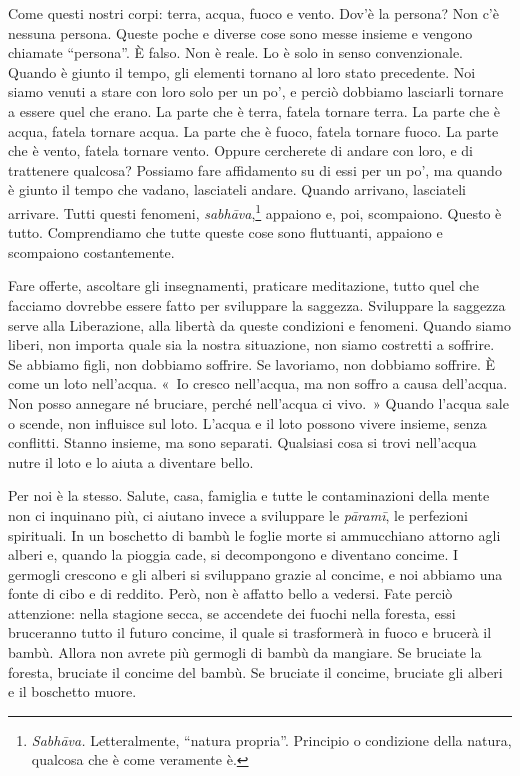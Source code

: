 Come questi nostri corpi: terra, acqua, fuoco e vento. Dov'è la persona?
Non c'è nessuna persona. Queste poche e diverse cose sono messe insieme
e vengono chiamate ``persona''. È falso. Non è reale. Lo è solo in senso
convenzionale. Quando è giunto il tempo, gli elementi tornano al loro
stato precedente. Noi siamo venuti a stare con loro solo per un po', e
perciò dobbiamo lasciarli tornare a essere quel che erano. La parte che
è terra, fatela tornare terra. La parte che è acqua, fatela tornare
acqua. La parte che è fuoco, fatela tornare fuoco. La parte che è vento,
fatela tornare vento. Oppure cercherete di andare con loro, e di
trattenere qualcosa? Possiamo fare affidamento su di essi per un po', ma
quando è giunto il tempo che vadano, lasciateli andare. Quando arrivano,
lasciateli arrivare. Tutti questi fenomeni, \emph{sabhāva},\footnote{\emph{Sabhāva.}
  Letteralmente, ``natura propria''. Principio o condizione della
  natura, qualcosa che è come veramente è.} appaiono e, poi, scompaiono.
Questo è tutto. Comprendiamo che tutte queste cose sono fluttuanti,
appaiono e scompaiono costantemente.

Fare offerte, ascoltare gli insegnamenti, praticare meditazione, tutto
quel che facciamo dovrebbe essere fatto per sviluppare la saggezza.
Sviluppare la saggezza serve alla Liberazione, alla libertà da queste
condizioni e fenomeni. Quando siamo liberi, non importa quale sia la
nostra situazione, non siamo costretti a soffrire. Se abbiamo figli, non
dobbiamo soffrire. Se lavoriamo, non dobbiamo soffrire. È come un loto
nell'acqua. «~Io cresco nell'acqua, ma non soffro a causa dell'acqua.
Non posso annegare né bruciare, perché nell'acqua ci vivo.~» Quando
l'acqua sale o scende, non influisce sul loto. L'acqua e il loto possono
vivere insieme, senza conflitti. Stanno insieme, ma sono separati.
Qualsiasi cosa si trovi nell'acqua nutre il loto e lo aiuta a diventare
bello.

Per noi è la stesso. Salute, casa, famiglia e tutte le contaminazioni
della mente non ci inquinano più, ci aiutano invece a sviluppare le
\emph{pāramī}, le perfezioni spirituali. In un boschetto di bambù le
foglie morte si ammucchiano attorno agli alberi e, quando la pioggia
cade, si decompongono e diventano concime. I germogli crescono e gli
alberi si sviluppano grazie al concime, e noi abbiamo una fonte di cibo
e di reddito. Però, non è affatto bello a vedersi. Fate perciò
attenzione: nella stagione secca, se accendete dei fuochi nella foresta,
essi bruceranno tutto il futuro concime, il quale si trasformerà in
fuoco e brucerà il bambù. Allora non avrete più germogli di bambù da
mangiare. Se bruciate la foresta, bruciate il concime del bambù. Se
bruciate il concime, bruciate gli alberi e il boschetto muore.

